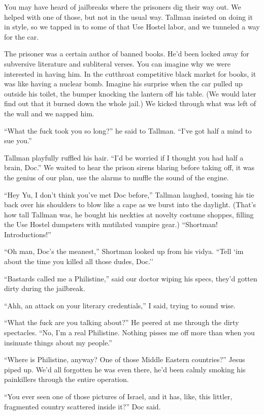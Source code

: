 \documentclass[oneside]{book}
\begin{document}
You may have heard of jailbreaks where the prisoners dig their way out.
We helped with one of those, but not in the usual way.  Tallman insisted
on doing it in style, so we tapped in to some of that Use Hostel labor,
and we tunneled a way for the car.

The prisoner was a certain author of banned books.  He'd been locked away
for subversive literature and subliteral verses.  You can imagine why
we were interested in having him.  In the cutthroat competitive black
market for books, it was like having a nuclear bomb.  Imagine his surprise
when the car pulled up outside his toilet, the bumper knocking the lantern
off his table.  (We would later find out that it burned down the whole
jail.)  We kicked through what was left of the wall and we napped him.

``What the fuck took you so long?'' he said to Tallman.  ``I've got half a
mind to sue you.''

Tallman playfully ruffled his hair.  ``I'd be worried if I thought you had
half a brain, Doc.''  We waited to hear the prison sirens
blaring before taking off, it was the genius of our plan, use the alarms to muffle
the sound of the engine.

``Hey Yu, I don't think you've met Doc before,'' Tallman laughed, tossing his tie back
over his shoulders to blow like a cape as we burst into the daylight.  (That's how
tall Tallman was, he bought his neckties at novelty costume shoppes, filling the Use Hostel
dumpsters with mutilated vampire gear.)  ``Shortman!  Introductions!''

``Oh man, Doc's the meanest,'' Shortman looked up from his vidya.
``Tell `im about the time you killed all those dudes, Doc.''

``Bastards called me a Philistine,'' said our doctor wiping his specs, they'd gotten
dirty during the jailbreak.

``Ahh, an attack on your literary credentials,'' I said, trying to sound wise.

``What the fuck are you talking about?''  He peered at me through the dirty
spectacles.  ``No, I'm a real Philistine.  Nothing pisses me off more than
when you insinuate things about my people.''

``Where is Philistine, anyway?  One of those Middle Eastern countries?''
Jesus piped up.  We'd all forgotten he was even there, he'd been calmly smoking
his painkillers through the entire operation.

``You ever seen one of those pictures of Israel, and it has, like, this littler,
fragmented country scattered inside it?'' Doc said.
\end{document}
